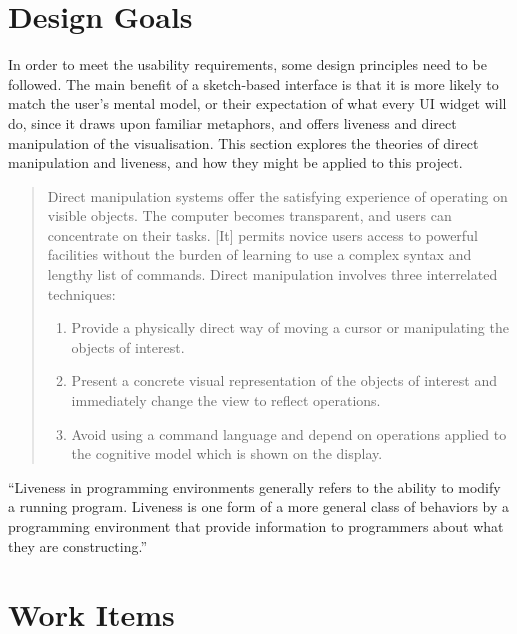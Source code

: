 	\section{Design Goals}
	In order to meet the usability requirements, some design principles need to be followed. The main benefit of a sketch-based interface is that it is more likely to match the user's mental model, or their expectation of what every UI widget will do, since it draws upon familiar metaphors, and offers liveness and direct manipulation of the visualisation. This section explores the theories of direct manipulation and liveness, and how they might be applied to this project.
	
	\begin{quote}
	Direct manipulation systems offer the satisfying experience of operating on visible objects. The computer becomes transparent, and users can concentrate on their tasks. [It] permits novice users access to powerful facilities without the burden of learning to use a complex syntax and lengthy list of commands. Direct manipulation involves three interrelated techniques: 
		\begin{enumerate}
			\item Provide a physically direct way of moving a cursor or manipulating the objects of interest.
			\item Present a concrete visual representation of the objects of interest and immediately change the view to reflect operations.
			\item Avoid using a command language and depend on operations applied to the cognitive model which is shown on the display.
		\end{enumerate}			
	\end{quote}
	\begin{flushright}
	\citep{shneiderman_direct_1983}
	\end{flushright}
	
	``Liveness in programming environments generally refers to the ability to modify a running program. Liveness is one form of a more general class of behaviors by a programming environment that provide information to programmers about what they are constructing.'' \citep{tanimoto_perspective_2013}
	
	\section{Work Items}

